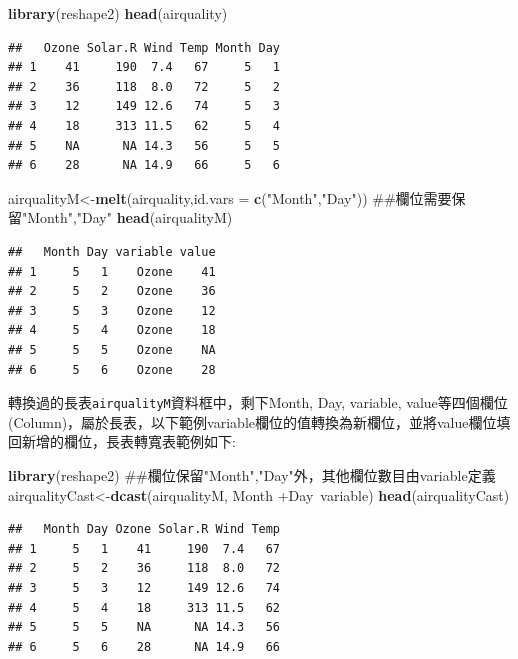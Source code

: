 \documentclass[]{book}
\newenvironment{Shaded}{\begin{snugshade}}{\end{snugshade}}
\newcommand{\KeywordTok}[1]{\textcolor[rgb]{0.13,0.29,0.53}{\textbf{{#1}}}}
\newcommand{\DataTypeTok}[1]{\textcolor[rgb]{0.13,0.29,0.53}{{#1}}}
\newcommand{\StringTok}[1]{\textcolor[rgb]{0.31,0.60,0.02}{{#1}}}
\newcommand{\NormalTok}[1]{{#1}}
\theoremstyle{definition}
\theoremstyle{definition}
\theoremstyle{remark}
\begin{document}
\begin{Shaded}
\begin{Highlighting}[]
\KeywordTok{library}\NormalTok{(reshape2)}
\KeywordTok{head}\NormalTok{(airquality)}
\end{Highlighting}
\end{Shaded}

\begin{verbatim}
##   Ozone Solar.R Wind Temp Month Day
## 1    41     190  7.4   67     5   1
## 2    36     118  8.0   72     5   2
## 3    12     149 12.6   74     5   3
## 4    18     313 11.5   62     5   4
## 5    NA      NA 14.3   56     5   5
## 6    28      NA 14.9   66     5   6
\end{verbatim}

\begin{Shaded}
\begin{Highlighting}[]
\NormalTok{airqualityM<-}\KeywordTok{melt}\NormalTok{(airquality,}\DataTypeTok{id.vars =} \KeywordTok{c}\NormalTok{(}\StringTok{"Month"}\NormalTok{,}\StringTok{"Day"}\NormalTok{)) ##欄位需要保留"Month","Day"}
\KeywordTok{head}\NormalTok{(airqualityM)}
\end{Highlighting}
\end{Shaded}

\begin{verbatim}
##   Month Day variable value
## 1     5   1    Ozone    41
## 2     5   2    Ozone    36
## 3     5   3    Ozone    12
## 4     5   4    Ozone    18
## 5     5   5    Ozone    NA
## 6     5   6    Ozone    28
\end{verbatim}

轉換過的長表\texttt{airqualityM}資料框中，剩下Month, Day, variable,
value等四個欄位
(Column)，屬於長表，以下範例variable欄位的值轉換為新欄位，並將value欄位填回新增的欄位，長表轉寬表範例如下:

\begin{Shaded}
\begin{Highlighting}[]
\KeywordTok{library}\NormalTok{(reshape2)}
\NormalTok{##欄位保留"Month","Day"外，其他欄位數目由variable定義}
\NormalTok{airqualityCast<-}\KeywordTok{dcast}\NormalTok{(airqualityM, Month +Day~variable) }
\KeywordTok{head}\NormalTok{(airqualityCast)}
\end{Highlighting}
\end{Shaded}

\begin{verbatim}
##   Month Day Ozone Solar.R Wind Temp
## 1     5   1    41     190  7.4   67
## 2     5   2    36     118  8.0   72
## 3     5   3    12     149 12.6   74
## 4     5   4    18     313 11.5   62
## 5     5   5    NA      NA 14.3   56
## 6     5   6    28      NA 14.9   66
\end{verbatim}
\end{document}
